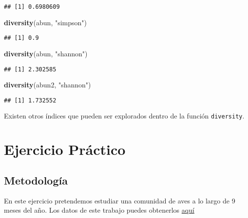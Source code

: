 \documentclass[]{book}
\newenvironment{Shaded}{\begin{snugshade}}{\end{snugshade}}
\newcommand{\KeywordTok}[1]{\textcolor[rgb]{0.13,0.29,0.53}{\textbf{{#1}}}}
\newcommand{\StringTok}[1]{\textcolor[rgb]{0.31,0.60,0.02}{{#1}}}
\newcommand{\NormalTok}[1]{{#1}}
\begin{document}
\begin{verbatim}
## [1] 0.6980609
\end{verbatim}

\begin{Shaded}
\begin{Highlighting}[]
\KeywordTok{diversity}\NormalTok{(abun, }\StringTok{"simpson"}\NormalTok{)}
\end{Highlighting}
\end{Shaded}

\begin{verbatim}
## [1] 0.9
\end{verbatim}

\begin{Shaded}
\begin{Highlighting}[]
\KeywordTok{diversity}\NormalTok{(abun, }\StringTok{"shannon"}\NormalTok{)}
\end{Highlighting}
\end{Shaded}

\begin{verbatim}
## [1] 2.302585
\end{verbatim}

\begin{Shaded}
\begin{Highlighting}[]
\KeywordTok{diversity}\NormalTok{(abun2, }\StringTok{"shannon"}\NormalTok{)}
\end{Highlighting}
\end{Shaded}

\begin{verbatim}
## [1] 1.732552
\end{verbatim}

Existen otros índices que pueden ser explorados dentro de la función
\texttt{diversity}.

\chapter{Ejercicio Práctico}\label{ejercicio-practico}

\section{Metodología}\label{metodologia}

En este ejercicio pretendemos estudiar una comunidad de aves a lo largo
de 9 meses del año. Los datos de este trabajo puedes obtenerlos
\href{https://github.com/Ciespinosa/datos_practicas/blob/master/Aves_temporal.xlsx}{aquí}
\end{document}
